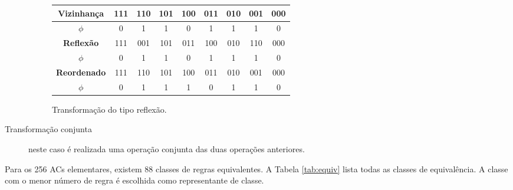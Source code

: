 \documentclass[12pt,a4paper]{article}
\begin{document}
\begin{description}
\begin{figure}[htp]
\begin{center}
\begin{tabular}{|c|c|c|c|c|c|c|c|c|}
\hline
\Large \textbf{Vizinhança}  & 111 & 110 & 101 & 100 & 011 & 010 & 001 & 000 \\ \hline
\Large \textbf{$\phi$}      &  0  &  1  &  1  &  0  &  1  &  1  &  1  &  0  \\ \hline
\hline
\Large \textbf{Reflexão}    & 111 & 001 & 101 & 011 & 100 & 010 & 110 & 000 \\ \hline
\Large \textbf{$\phi$}      &  0  &  1  &  1  &  0  &  1  &  1  &  1  &  0  \\ \hline
\hline
\Large \textbf{Reordenado}  & 111 & 110 & 101 & 100 & 011 & 010 & 001 & 000 \\ \hline
\Large \textbf{$\phi$}      &  0  &  1  &  1  &  1  &  0  &  1  &  1  &  0  \\ \hline
\end{tabular}
\caption{Transformação do tipo reflexão.}
\label{fig:reflex}
\end{center}
\end{figure}

\newpage

\item[Transformação conjunta] neste caso é realizada uma operação conjunta das duas
operações anteriores.

\end{description}

Para os 256 ACs elementares, existem 88 classes de regras equivalentes.
A Tabela \ref{tab:equiv} lista todas as classes de equivalência. A classe com o menor número
de regra é escolhida como representante de classe.
\end{document}
